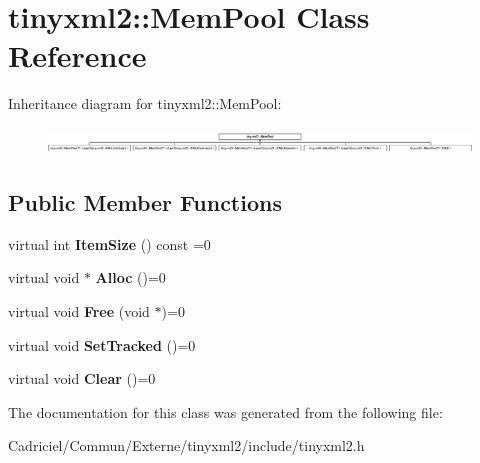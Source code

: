 \hypertarget{classtinyxml2_1_1_mem_pool}{}\section{tinyxml2\+:\+:Mem\+Pool Class Reference}
\label{classtinyxml2_1_1_mem_pool}
Inheritance diagram for tinyxml2\+:\+:Mem\+Pool\+:\begin{figure}[H]
\begin{center}
\leavevmode
\includegraphics[height=0.691358cm]{classtinyxml2_1_1_mem_pool}
\end{center}
\end{figure}
\subsection*{Public Member Functions}
\begin{DoxyCompactItemize}
\item 
virtual int {\bfseries Item\+Size} () const  =0\hypertarget{classtinyxml2_1_1_mem_pool_afb3d8c6cbe91b44f90043d0d94dc7306}{}\label{classtinyxml2_1_1_mem_pool_afb3d8c6cbe91b44f90043d0d94dc7306}

\item 
virtual void $\ast$ {\bfseries Alloc} ()=0\hypertarget{classtinyxml2_1_1_mem_pool_a4f977b5fed752c0bbfe5295f469d6449}{}\label{classtinyxml2_1_1_mem_pool_a4f977b5fed752c0bbfe5295f469d6449}

\item 
virtual void {\bfseries Free} (void $\ast$)=0\hypertarget{classtinyxml2_1_1_mem_pool_a49e3bfac2cba2ebd6776b31e571f64f7}{}\label{classtinyxml2_1_1_mem_pool_a49e3bfac2cba2ebd6776b31e571f64f7}

\item 
virtual void {\bfseries Set\+Tracked} ()=0\hypertarget{classtinyxml2_1_1_mem_pool_ac5804dd1387b2e4de5eef710076a0db1}{}\label{classtinyxml2_1_1_mem_pool_ac5804dd1387b2e4de5eef710076a0db1}

\item 
virtual void {\bfseries Clear} ()=0\hypertarget{classtinyxml2_1_1_mem_pool_a74fcdef9756917c8ae19fbbb4d658ed7}{}\label{classtinyxml2_1_1_mem_pool_a74fcdef9756917c8ae19fbbb4d658ed7}

\end{DoxyCompactItemize}


The documentation for this class was generated from the following file\+:\begin{DoxyCompactItemize}
\item 
Cadriciel/\+Commun/\+Externe/tinyxml2/include/tinyxml2.\+h\end{DoxyCompactItemize}
